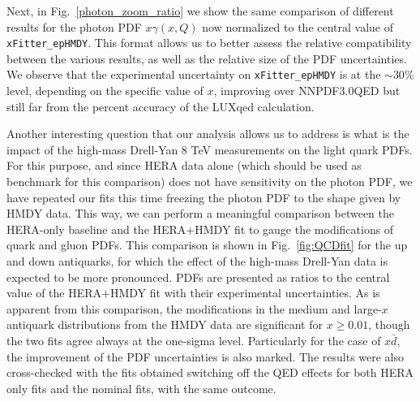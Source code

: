 Next, in Fig.~\ref{photon_zoom_ratio} we show the same comparison of
different results for the photon PDF $x\gamma(x,Q)$ now normalized to
the central value of {\tt xFitter\_epHMDY}.
%
This format allows us to better assess the relative compatibility
between the various results, as well as the relative size of the PDF
uncertainties.
%
We observe that the experimental uncertainty on {\tt xFitter\_epHMDY}
is at the $\sim 30\%$ level, depending on the specific value of $x$,
improving over NNPDF3.0QED but still far from the percent accuracy of
the LUXqed calculation.

Another interesting question that our analysis allows us to address is
what is the impact of the high-mass Drell-Yan 8 TeV measurements on
the light quark PDFs.
%
For this purpose, and since HERA data alone (which should be used as
benchmark for this comparison) does not have sensitivity on the photon
PDF, we have repeated our fits this time freezing the photon PDF to the
shape given by HMDY data.
%
This way, we can perform a meaningful comparison between the HERA-only
baseline and the HERA+HMDY fit to gauge the modifications of quark and
gluon PDFs.
%
This comparison is shown in Fig.~\ref{fig:QCDfit} for the up and down
antiquarks, for which the effect of the high-mass Drell-Yan data is
expected to be more pronounced. PDFs are presented as ratios to the
central value of the HERA+HMDY fit with their experimental uncertainties.
%
As is apparent from this comparison, the modifications in the medium
and large-$x$ antiquark distributions from the HMDY data are
significant for $x\ge 0.01$, though the two fits agree always at the
one-sigma level.
%
Particularly for the case of $x\bar{d}$, the improvement of the PDF
uncertainties is also marked.
%
The results were also cross-checked with the fits obtained switching
off the QED effects for both HERA only fits and the nominal fits, with
the same outcome.

